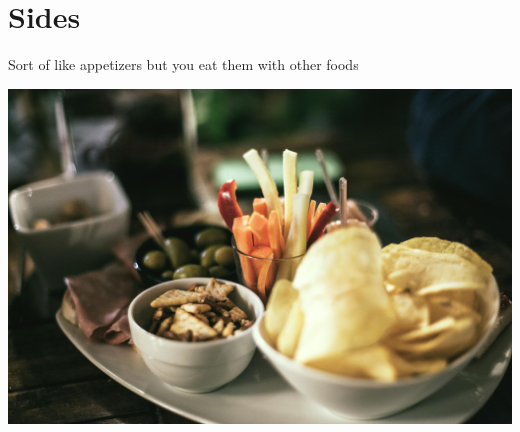 \chapter{Sides}

Sort of like appetizers but you eat them with other foods

\centering
\includegraphics{images/food-vegetables-italian-restaurant.jpg}

